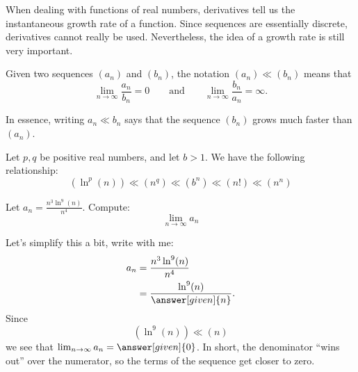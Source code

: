 \documentclass{ximera}
\begin{document}
When dealing with functions of real numbers, derivatives tell us the
instantaneous growth rate of a function. Since sequences are essentially
discrete, derivatives cannot really be used. Nevertheless, the idea of
a growth rate is still very important.

\begin{definition}
  Given two sequences $(a_n)$ and $(b_n)$, the notation $(a_n) \ll
  (b_n)$ means that
  \[
  \lim_{n\to\infty} \frac{a_n}{b_n} =
  0\qquad\text{and}\qquad\lim_{n\to\infty} \frac{b_n}{a_n} =\infty.
  \]
\end{definition}

In essence, writing $a_n \ll b_n$ says that the sequence $(b_n)$ grows
much faster than $(a_n)$.


\begin{theorem}
  Let $p,q$ be positive real numbers, and let $b> 1$. We have the
  following relationship:
  \[
  (\ln^p(n))\ll (n^q) \ll (b^n) \ll (n!) \ll (n^n)
  \]
\end{theorem}

\begin{example}
  Let $a_n  = \frac{n^3\ln^{9}(n)}{n^4}$. Compute:
  \[
  \lim_{n\to \infty}a_n
  \]
  \begin{explanation}
    Let's simplify this a bit, write with me:
    \begin{align*}
      a_n &= \frac{n^3\ln^{9}(n)}{n^4}\\
      &= \frac{\ln^{9}(n)}{\answer[given]{n}}.
    \end{align*}
    Since
    \[
    (\ln^{9}(n))\ll (n)
    \]
    we see that $\lim_{n\to\infty}a_n =\answer[given]{0}$.  In short, the 
    denominator ``wins out'' over the numerator, so the terms of the 
    sequence get closer to zero.
  \end{explanation}
\end{example}
\end{document}
